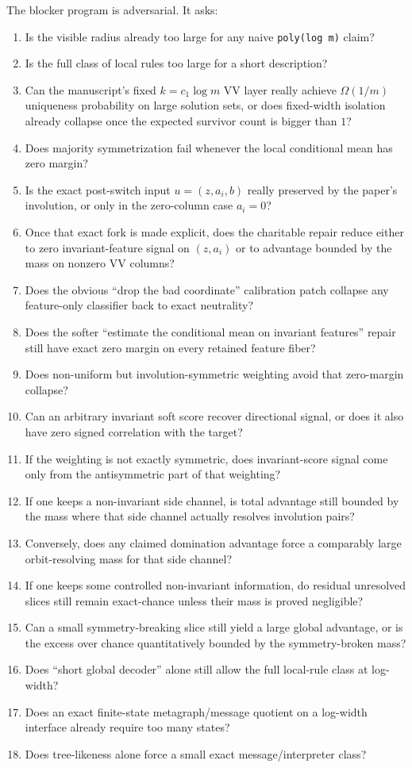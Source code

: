 \documentclass[11pt]{article}
\theoremstyle{remark}
\begin{document}
The blocker program is adversarial.  It asks:
\begin{enumerate}[leftmargin=1.5em]
  \item Is the visible radius already too large for any naive \texttt{poly(log m)} claim?
  \item Is the full class of local rules too large for a short description?
  \item Can the manuscript's fixed \(k=c_1\log m\) VV layer really achieve \(\Omega(1/m)\)
  uniqueness probability on large solution sets, or does fixed-width isolation already collapse
  once the expected survivor count is bigger than \(1\)?
  \item Does majority symmetrization fail whenever the local conditional mean has zero margin?
  \item Is the exact post-switch input \(u=(z,a_i,b)\) really preserved by the paper's involution,
  or only in the zero-column case \(a_i=0\)?
  \item Once that exact fork is made explicit, does the charitable repair reduce either to zero
  invariant-feature signal on \((z,a_i)\) or to advantage bounded by the mass on nonzero VV columns?
  \item Does the obvious ``drop the bad coordinate'' calibration patch collapse any feature-only
  classifier back to exact neutrality?
  \item Does the softer ``estimate the conditional mean on invariant features'' repair still have
  exact zero margin on every retained feature fiber?
  \item Does non-uniform but involution-symmetric weighting avoid that zero-margin collapse?
  \item Can an arbitrary invariant soft score recover directional signal, or does it also have zero
  signed correlation with the target?
  \item If the weighting is not exactly symmetric, does invariant-score signal come only from the
  antisymmetric part of that weighting?
  \item If one keeps a non-invariant side channel, is total advantage still bounded by the mass
  where that side channel actually resolves involution pairs?
  \item Conversely, does any claimed domination advantage force a comparably large orbit-resolving
  mass for that side channel?
  \item If one keeps some controlled non-invariant information, do residual unresolved slices still
  remain exact-chance unless their mass is proved negligible?
  \item Can a small symmetry-breaking slice still yield a large global advantage, or is the excess
  over chance quantitatively bounded by the symmetry-broken mass?
  \item Does ``short global decoder'' alone still allow the full local-rule class at log-width?
  \item Does an exact finite-state metagraph/message quotient on a log-width interface already
  require too many states?
  \item Does tree-likeness alone force a small exact message/interpreter class?
\end{enumerate}
\end{document}
